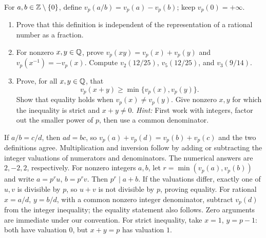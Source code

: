 For $a,b\in\mathbb Z\setminus\{0\}$, define
$v_p(a/b)=v_p(a)-v_p(b)$; keep $v_p(0)=+\infty$.
\begin{enumerate}
 \item Prove that this definition is independent of the representation
 of a rational number as a fraction. 
 \item For nonzero $x,y\in\mathbb Q$, prove $v_p(xy)=v_p(x)+v_p(y)$ and
 $v_p(x^{-1})=-v_p(x)$. Compute
 $v_2(12/25)$, $v_5(12/25)$, and $v_3(9/14)$. 
 \item Prove, for all $x,y\in\mathbb Q$, that
 \[
 v_p(x+y)\ge\min\{v_p(x),v_p(y)\}.
 \]
 Show that equality holds when $v_p(x)\ne v_p(y)$.
 Give nonzero $x,y$ for which the inequality is strict and $x+y\ne0$.
 \emph{Hint:} First work with integers, factor out the smaller power of $p$,
 then use a common denominator. 
\end{enumerate}
\begin{solution}
If $a/b=c/d$, then $ad=bc$, so
$v_p(a)+v_p(d)=v_p(b)+v_p(c)$ and the two definitions agree.
Multiplication and inversion follow by adding or subtracting the integer
valuations of numerators and denominators. The numerical answers are
$2,-2,2$, respectively.
For nonzero integers $a,b$, let $r=\min(v_p(a),v_p(b))$ and write
$a=p^ru$, $b=p^rv$. Then $p^r\mid a+b$.
If the valuations differ, exactly one of $u,v$ is divisible by $p$, so
$u+v$ is not divisible by $p$, proving equality.
For rational $x=a/d$, $y=b/d$, with a common nonzero integer denominator,
subtract $v_p(d)$ from the integer inequality; the equality statement
also follows. Zero arguments are immediate under our convention.
For strict inequality, take $x=1$, $y=p-1$: both have valuation $0$,
but $x+y=p$ has valuation $1$.
\end{solution}

